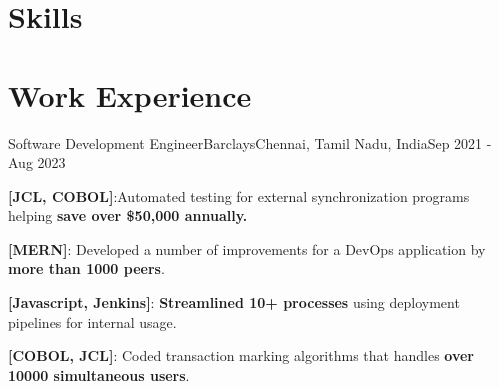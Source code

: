 \documentclass[letterpaper]{resume_config}
\begin{document}
\vspace{-20pt}

\section{Skills}
\vspace{-10pt}


\section{Work Experience}

\WorkExperience
    {Software Development Engineer}{Barclays}{Chennai, Tamil Nadu, India}{Sep 2021 - Aug 2023}
    {
        \item {\textbf{[JCL, COBOL]}:Automated testing for external synchronization programs helping \textbf{save over \$50,000 annually.}}
        \item {\textbf{[MERN]}: {Developed a number of improvements for a DevOps application by \textbf{more than 1000 peers}.}} 
        \item {\textbf{[Javascript, Jenkins]}: \textbf{Streamlined 10+ processes} using deployment pipelines for internal usage.}
        \item {\textbf{[COBOL, JCL]}: Coded transaction marking algorithms that handles \textbf{over 10000 simultaneous users}.}
    }

\vspace{-10pt}
\end{document}
